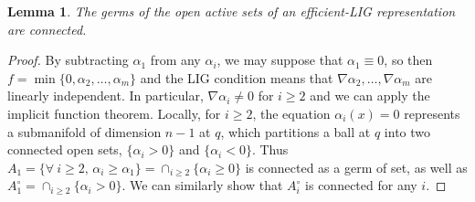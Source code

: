 \documentclass[11pt]{article}
\newcommand{\inter}{\cap}
\newcommand{\grad}{\nabla}
\theoremstyle{plain}
\newtheorem{lem}{Lemma}
\theoremstyle{definition}
\theoremstyle{remark}
\begin{document}
\begin{lem}
	\label{lem:connected}
	The germs of the open active sets of an efficient-LIG representation are connected.
\end{lem}
\begin{proof}
By subtracting $\alpha_1$ from any $\alpha_i$, we may suppose that $\alpha_1 \equiv 0$, so then $f = \min\{0, \alpha_2, \ldots, \alpha_m\}$ and the LIG condition means that $\grad \alpha_2, \ldots, \grad \alpha_m$ are linearly independent. In particular, $\grad \alpha_i \neq 0$ for $i \geq 2$ and we can apply the implicit function theorem. Locally, for $i \geq 2$, the equation $\alpha_i(x) = 0$ represents a submanifold of dimension $n-1$ at $q$, which partitions a ball at $q$ into two connected open sets, $\{\alpha_i > 0\}$ and $\{\alpha_i < 0\}$. Thus $A_1 = \{\forall\ i \geq 2,\, \alpha_i \geq \alpha_1 \} = \inter_{i \geq 2} \{\alpha_i \geq 0\}$ is connected as a germ of set, as well as $A_1^\circ = \inter_{i \geq 2} \{\alpha_i > 0\}$. We can similarly show  that $A_i^\circ$ is connected for any $i$.
\end{proof}
\end{document}
